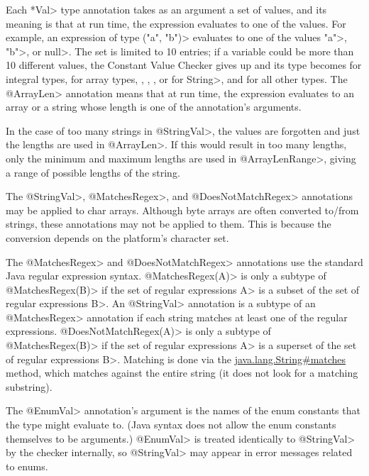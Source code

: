 Each \<*Val> type annotation takes as an argument a set of values, and its
meaning is that at run time, the expression evaluates to one of the values.  For
example, an expression of type
\<("a", "b")> evaluates to
one of the values \<"a">, \<"b">, or \<null>.
The set is limited to 10 entries; if a variable
could be more than 10 different values, the Constant Value
Checker gives up and its type becomes
 for integral types,
 for array types,
,
,
, or
 for \<String>, and
 for all other types.
The \<@ArrayLen> annotation means that at run time, the expression
evaluates to an array or a string whose length is one of the annotation's arguments.

In the case of too many strings in \<@StringVal>, the values are forgotten
and just the lengths are used in \<@ArrayLen>.
If this would result in too many lengths,
only the minimum and maximum lengths are used in \<@ArrayLenRange>,
giving a range of possible lengths of the string.

The \<@StringVal>, \<@MatchesRegex>, and \<@DoesNotMatchRegex>
annotations may be applied to char arrays.  Although byte
arrays are often converted to/from strings, these annotations may
not be applied to them.  This is because the conversion depends on the
platform's character set.

The \<@MatchesRegex> and \<@DoesNotMatchRegex> annotations use the standard Java regular expression syntax.
\<@MatchesRegex(A)> is only a subtype of \<@MatchesRegex(B)> if the set of regular
expressions \<A> is a subset of the set of regular expressions \<B>. An
\<@StringVal> annotation is a subtype of an \<@MatchesRegex> annotation if
each string matches at least one of the regular expressions.
\<@DoesNotMatchRegex(A)> is only a subtype of \<@MatchesRegex(B)> if the set of regular
expressions \<A> is a superset of the set of regular expressions \<B>.
Matching is done
via the
\href{https://docs.oracle.com/en/java/javase/17/docs/api/java.base/java/lang/String.html\#matches(java.lang.String)}{java.lang.String\#matches}
method, which matches against the entire string (it does not look for a
matching substring).

The \<@EnumVal> annotation's argument is the names of the enum constants
that the type might evaluate to.  (Java syntax does not allow the enum
constants themselves to be arguments.)  \<@EnumVal>
is treated identically to \<@StringVal> by the checker internally, so
\<@StringVal> may appear in error messages related to enums.

